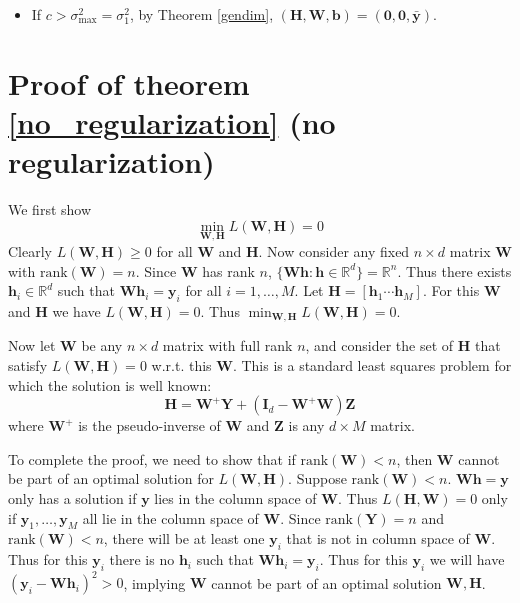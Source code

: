 \documentclass{article}
\theoremstyle{plain}
\theoremstyle{definition}
\theoremstyle{remark}
\newcommand{\bW}{{\mathbf W}}
\newcommand{\bY}{{\mathbf Y}}
\newcommand{\bH}{{\mathbf H}}
\newcommand{\bI}{{\mathbf I}}
\newcommand{\bZ}{{\mathbf Z}}
\newcommand{\bh}{{\mathbf h}}
\newcommand{\by}{{\mathbf y}}
\newcommand{\byb}{{\bar{\mathbf y}}}
\newcommand{\bb}{{\mathbf b}}
\newcommand{\be}{{\mathbf e}}
\newcommand{\bw}{{\mathbf w}}
\newcommand{\lH}{\lambda_{\bH}}
\newcommand{\lW}{\lambda_{\bW}}
\newcommand{\Rd}{\mathbb{R}^d}
\begin{document}
\begin{itemize}
    The analysis of the case $j*=1$, i.e., $c<\sigma_1^2$ but $c>\sigma_2^2$, $c>\sigma_3^2$ is analogous, therefore we just record the form of the $\bw_j$'s and $\bh_i$'s, omitting any further details:
    \begin{align*}
    \bw_1^T&=\sqrt{\lH \left(\frac{\sigma_1}{c^{1/2}}-1\right)} \be, \qquad \bw_2^T=\bw_3^T=\mathbf{0},
    \\
    \bh_i& = \sqrt{\frac{\lW}{\lH}} 
    \frac{(\by_i^{(1)}-\byb^{(1)})}{\sigma_1} \bw_1^T,
    \end{align*}
    for all $i=1,...,M$. In other words, for fixed $i$, the feature vector $\bh_i$ is colinear with $\bw_1^T$.
    \item If $c>\sigma_{\text{max}}^2=\sigma_1^2$, by Theorem \ref{gendim}, $(\bH, \bW, \bb)=(\mathbf{0}, \mathbf{0}, \byb)$.
\end{itemize}

\section{Proof of theorem \ref{no_regularization} (no regularization)}
\label{sec:e_exp}
We first show
\begin{equation*}
    \min_{\bW,\bH} L(\bW,\bH) = 0
\end{equation*}
Clearly $L(\bW,\bH) \geq 0$ for all $\bW$ and $\bH$. Now consider any fixed $n \times d$ matrix $\bW$ with $\text{rank}(\bW) = n$. Since $\bW$ has rank $n$, $\{ \bW \bh : \bh \in \Rd \} = \mathbb{R}^n$.
Thus there exists $\bh_i \in \Rd$ such that $\bW \bh_i = \by_i$ for all $i=1,\ldots,M$. 
Let $\bH = [\bh_1 \cdots \bh_M]$. 
For this $\bW$ and $\bH$ we have $L(\bW,\bH) = 0$. Thus $\min_{\bW,\bH} L(\bW,\bH) = 0$. 

Now let $\bW$ be any $n \times d$ matrix with full rank $n$, and consider the set of $\bH$ that satisfy $L(\bW,\bH)=0$ w.r.t. this $\bW$. This is a standard least squares problem for which the solution is well known: 
\begin{equation}
    \bH = \bW^+ \bY + (\bI_d - \bW^{+} \bW) \bZ
\end{equation}
where $\bW^+$ is the pseudo-inverse of $\bW$ and $\bZ$ is any $d \times M$ matrix.

To complete the proof, we need to show that if $\mbox{rank}(\bW) < n$, then $\bW$ cannot be part of an optimal solution for $L(\bW,\bH)$.
Suppose $\mbox{rank}(\bW) < n$. $\bW \bh = \by$ only has a solution if $\by$ lies in the column space of $\bW$. Thus $L(\bH,\bW) =0$ only if $\by_1,\ldots,\by_M$ all lie in the column space of $\bW$. Since $\mbox{rank}(\bY) = n$ and $\mbox{rank}(\bW) < n$, there will be at least one $\by_i$ that is not in column space of $\bW$. Thus for this $\by_i$ there is no $\bh_i$ such that $\bW \bh_i = \by_i$. Thus for this $\by_i$ we will have 
$(\by_i - \bW \bh_i)^2  > 0$, implying $\bW$ cannot be part of an optimal solution $\bW,\bH$.
\end{document}
